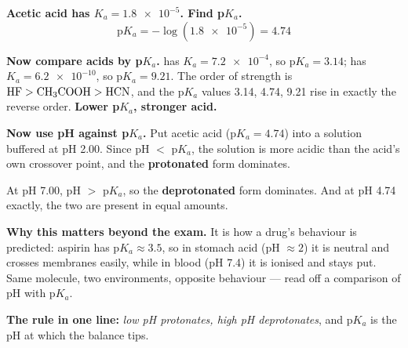 \documentclass{apchem-worksheet}
\begin{document}
\begin{center}
\end{center}

\begin{workedexample}
\textbf{Acetic acid has $K_{a} = \num{1.8e-5}$. Find p$K_{a}$.}
\[ \text{p}K_{a} = -\log(\num{1.8e-5}) = \mathbf{4.74} \]

\textbf{Now compare acids by p$K_{a}$.}  has
$K_{a} = \num{7.2e-4}$, so p$K_{a} = 3.14$;  has
$K_{a} = \num{6.2e-10}$, so p$K_{a} = 9.21$. The order of strength is
$\ce{HF} > \ce{CH3COOH} > \ce{HCN}$, and the p$K_{a}$ values 3.14,
4.74, 9.21 rise in exactly the reverse order. \textbf{Lower p$K_{a}$,
stronger acid.}

\textbf{Now use pH against p$K_{a}$.} Put acetic acid
(p$K_{a} = 4.74$) into a solution buffered at pH 2.00. Since pH $<$
p$K_{a}$, the solution is more acidic than the acid's own crossover
point, and the \textbf{protonated} form  dominates.

At pH 7.00, pH $>$ p$K_{a}$, so the \textbf{deprotonated} form
 dominates. And at pH 4.74 exactly, the two are present in
equal amounts.

\textbf{Why this matters beyond the exam.} It is how a drug's behaviour
is predicted: aspirin has p$K_{a} \approx 3.5$, so in stomach acid
(pH $\approx 2$) it is neutral and crosses membranes easily, while in
blood (pH 7.4) it is ionised and stays put. Same molecule, two
environments, opposite behaviour --- read off a comparison of pH with
p$K_{a}$.

\textbf{The rule in one line:} \emph{low pH protonates, high pH
deprotonates}, and p$K_{a}$ is the pH at which the balance tips.
\end{workedexample}
\end{document}
